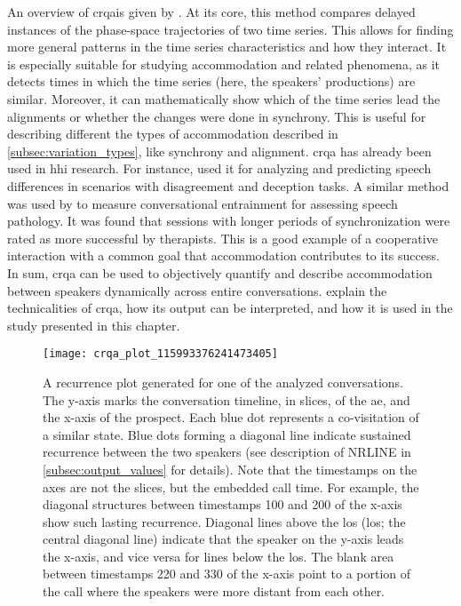 An overview of \ac{crqa}is given by \citet{Wallot2018analyzing}.
At its core, this method compares delayed instances of the phase-space trajectories of two time series.
This allows for finding more general patterns in the time series characteristics and how they interact.
It is especially suitable for studying accommodation and related phenomena, as it detects times in which the time series (here, the speakers' productions) are similar.
Moreover, it can mathematically show which of the time series lead the alignments or whether the changes were done in synchrony.
This is useful for describing different the types of accommodation described in \cref{subsec:variation_types}, like synchrony and alignment.
\Ac{crqa} has already been used in \ac{hhi} research.
For instance, \citet{Duran2017conversing} used it for analyzing and predicting speech differences in scenarios with disagreement and deception tasks.
A similar method was used by \citep{Borrie2019syncing} to measure conversational entrainment for assessing speech pathology.
It was found that sessions with longer periods of synchronization were rated as more successful by therapists.
This is a good example of a cooperative interaction with a common goal that accommodation contributes to its success.
In sum, \ac{crqa} can be used to objectively quantify and describe accommodation between speakers dynamically across entire conversations.
 explain the technicalities of \ac{crqa}, how its output can be interpreted, and how it is used in the study presented in this chapter.
%
\begin{figure}
	\centering
	\texttt{[image: crqa\_plot\_115993376241473405]}
	\caption[\acs{crqa} analysis of pitch in a sales call]
		{A recurrence plot generated for one of the analyzed conversations.
		The y-axis marks the conversation timeline, in slices, of the \ac{ae}, and the x-axis of the prospect.
		Each blue dot represents a co-visitation of a similar state.
		Blue dots forming a diagonal line indicate sustained recurrence between the two speakers (see description of NRLINE in \cref{subsec:output_values} for details).
		Note that the timestamps on the axes are not the slices, but the embedded call time.
		For example, the diagonal structures between timestamps 100 and 200 of the x-axis show such lasting recurrence.
		Diagonal lines above the \acl{los} (\acs{los}; the central diagonal line) indicate that the speaker on the y-axis leads the x-axis, and vice versa for lines below the \ac{los}.
		The blank area between timestamps 220 and 330 of the x-axis point to a portion of the call where the speakers were more distant from each other.}
	\label{fig:crqa_plot}
\end{figure}

